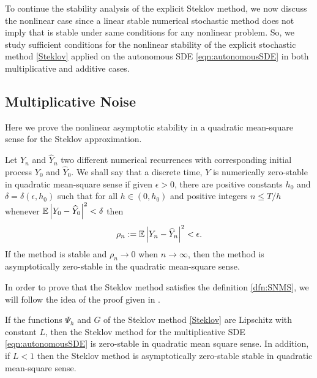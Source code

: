 
		To continue the stability analysis of the explicit Steklov method,  we now discuss
	the nonlinear case since a linear stable numerical stochastic method  does  not imply
	that is stable  under same conditions for any nonlinear problem. So, we study
	sufficient conditions for the nonlinear stability of the explicit stochastic method
	\eqref{Steklov} applied on the  autonomous SDE \eqref{eqn:autonomousSDE} in both
	multiplicative and additive cases.
	\subsection{Multiplicative Noise}
	Here  we prove the nonlinear asymptotic stability in a quadratic mean-square sense
	for the Steklov approximation.
	\begin{dfn}\label{dfn:SNMS}
		Let $Y_n$ and $\widehat{Y}_n$ two different numerical recurrences  with
		corresponding initial process  $Y_0$ and $\widehat{Y}_0$. We shall say that a
		discrete time, $Y$ is numerically zero-stable in quadratic mean-square sense if given
		$\epsilon >0$, there  are positive constants $h_0$ and $\delta=\delta(\epsilon,h_0)$
		such that for all $h\in(0,h_0)$ and positive integers $n \leq T/h$ whenever
		$\mathbb{E}\left|Y_0-\widehat{Y}_0\right|^2<\delta$ then
		\begin {eqnarray}\label{eqn:SNMS}
			\rho_n :=
			\mathbb{E}\left|Y_n-\widehat{Y}_{n}\right|^2<\epsilon .
		\end{eqnarray}
		If the method is stable and $\rho_n \to 0$ when $n\to \infty$, then the method is
		asymptotically zero-stable in the quadratic mean-square sense.
	\end{dfn}
	In order to prove that the Steklov method satisfies the definition
	\ref{dfn:SNMS}, we will follow the idea of the proof given in
	\cite[Thm. 4]{Baker2000a}.
	\begin{thm}
			If the functions $\Psi_h$ and $G$ of the Steklov method \eqref{Steklov} are
		Lipschitz with constant $L$, then the Steklov method for the multiplicative SDE 
		\eqref{eqn:autonomousSDE} is zero-stable in quadratic mean square sense.
		In addition, if $L<1$ then the Steklov method is asymptotically zero-stable stable in 
		quadratic mean-square sense.
	\end{thm}
